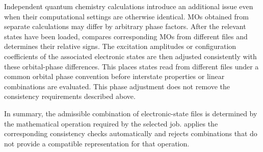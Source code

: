 Independent quantum chemistry calculations introduce an additional issue even when their computational settings are otherwise identical. MOs obtained from separate calculations may differ by arbitrary phase factors. After the relevant states have been loaded, \progname{} compares corresponding MOs from different files and determines their relative signs. The excitation amplitudes or configuration coefficients of the associated electronic states are then adjusted consistently with these orbital-phase differences. This places states read from different files under a common orbital phase convention before interstate properties or linear combinations are evaluated.
This phase adjustment does not remove the consistency requirements described above.

In summary, the admissible combination of electronic-state files is determined by the mathematical operation required by the selected job. \progname{} applies the corresponding consistency checks automatically and rejects combinations that do not provide a compatible representation for that operation.